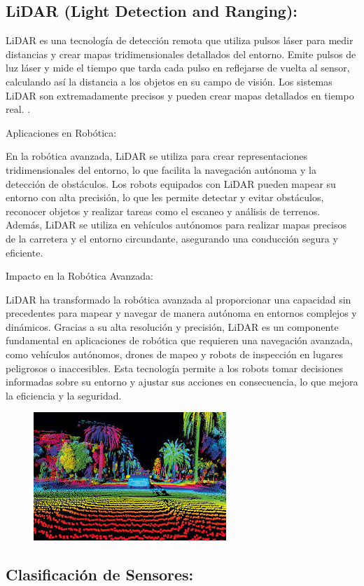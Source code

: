 \subsection{ \textbf{LiDAR (Light Detection and Ranging}):}

LiDAR es una tecnología de detección remota que utiliza pulsos láser para medir distancias y crear mapas tridimensionales detallados del entorno. Emite pulsos de luz láser y mide el tiempo que tarda cada pulso en reflejarse de vuelta al sensor, calculando así la distancia a los objetos en su campo de visión. Los sistemas LiDAR son extremadamente precisos y pueden crear mapas detallados en tiempo real. \cite{wehr1999airborne}.


Aplicaciones en Robótica:


En la robótica avanzada, LiDAR se utiliza para crear representaciones tridimensionales del entorno, lo que facilita la navegación autónoma y la detección de obstáculos. Los robots equipados con LiDAR pueden mapear su entorno con alta precisión, lo que les permite detectar y evitar obstáculos, reconocer objetos y realizar tareas como el escaneo y análisis de terrenos. Además, LiDAR se utiliza en vehículos autónomos para realizar mapas precisos de la carretera y el entorno circundante, asegurando una conducción segura y eficiente.


Impacto en la Robótica Avanzada:


LiDAR ha transformado la robótica avanzada al proporcionar una capacidad sin precedentes para mapear y navegar de manera autónoma en entornos complejos y dinámicos. Gracias a su alta resolución y precisión, LiDAR es un componente fundamental en aplicaciones de robótica que requieren una navegación avanzada, como vehículos autónomos, drones de mapeo y robots de inspección en lugares peligrosos o inaccesibles. Esta tecnología permite a los robots tomar decisiones informadas sobre su entorno y ajustar sus acciones en consecuencia, lo que mejora la eficiencia y la seguridad.
\begin{figure} [h]
	\centering
	\includegraphics[width=0.3\linewidth]{img/lidar}
	\caption{}
	\label{fig:lidar}
\end{figure}

\newpage
\subsection{Clasificación de Sensores:}

